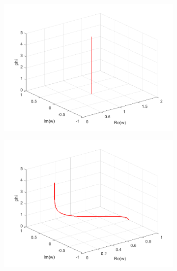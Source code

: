 \documentclass[a4paper,11pt]{article}
\begin{document}
\begin{figure}[!h]
\begin{subfigure}[c]{0.3\textwidth}
\includegraphics[width=\linewidth]{plot7_musg10.png}
\end{subfigure}
\begin{subfigure}[c]{0.3\textwidth}
\includegraphics[width=\linewidth]{plot7_musg11.png}
\end{subfigure}
\begin{subfigure}[c]{0.3\textwidth}

\end{subfigure}
\end{figure}
\end{document}
